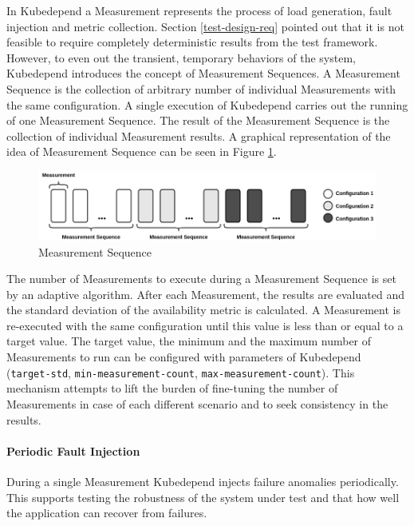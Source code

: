 In Kubedepend a Measurement represents the process of load generation, fault injection and metric collection. Section \ref{test-design-req} pointed out that it is not feasible to require completely deterministic results from the test framework. However, to even out the transient, temporary behaviors of the system, Kubedepend introduces the concept of Measurement Sequences. A Measurement Sequence is the collection of arbitrary number of individual Measurements with the same configuration. A single execution of Kubedepend carries out the running of one Measurement Sequence. The result of the Measurement Sequence is the collection of individual Measurement results. A graphical representation of the idea of Measurement Sequence can be seen in Figure \ref{fig:measurement_sequence}.

\begin{figure}[h]
	\centering
	\includegraphics[width=140mm, keepaspectratio]{figures/measurement_sequence.png}
	\caption{Measurement Sequence}
	\label{fig:measurement_sequence}
\end{figure}

The number of Measurements to execute during a Measurement Sequence is set by an adaptive algorithm. After each Measurement, the results are evaluated and the standard deviation of the availability metric is calculated. A Measurement is re-executed with the same configuration until this value is less than or equal to a target value. The target value, the minimum and the maximum number of Measurements to run can be configured with parameters of Kubedepend (\texttt{target-std}, \texttt{min-measurement-count}, \texttt{max-measurement-count}). This mechanism attempts to lift the burden of fine-tuning the number of Measurements in case of each different scenario and to seek consistency in the results.




\paragraph{Periodic Fault Injection} During a single Measurement Kubedepend injects failure anomalies periodically. This supports testing the robustness of the system under test and that how well the application can recover from failures.

